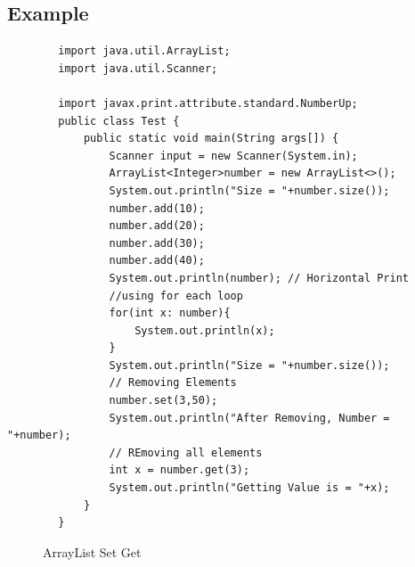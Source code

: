 \documentclass[openany]{book}  %
\begin{document}
\subsection{Example}
\begin{center}
    \begin{verbatim}
        import java.util.ArrayList;
        import java.util.Scanner;

        import javax.print.attribute.standard.NumberUp;
        public class Test {
            public static void main(String args[]) {
                Scanner input = new Scanner(System.in);
                ArrayList<Integer>number = new ArrayList<>();
                System.out.println("Size = "+number.size());
                number.add(10);
                number.add(20);
                number.add(30);
                number.add(40);
                System.out.println(number); // Horizontal Print
                //using for each loop
                for(int x: number){
                    System.out.println(x);
                }
                System.out.println("Size = "+number.size());
                // Removing Elements
                number.set(3,50);
                System.out.println("After Removing, Number = "+number);
                // REmoving all elements
                int x = number.get(3);
                System.out.println("Getting Value is = "+x); 
            }
        }
    \end{verbatim}
\end{center}
% 
% 
\begin{figure}[htbp]
    \begin{center}
        \caption{ArrayList Set Get\cite{Ref3}}
    \end{center}
\end{figure}
\end{document}
